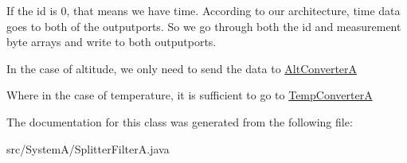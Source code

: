 If the id is 0, that means we have time. According to our architecture, time data goes to both of the outputports. So we go through both the id and measurement byte arrays and write to both outputports.

In the case of altitude, we only need to send the data to \hyperlink{class_system_a_1_1_alt_converter_a}{Alt\+Converter\+A}

Where in the case of temperature, it is sufficient to go to \hyperlink{class_system_a_1_1_temp_converter_a}{Temp\+Converter\+A}

The documentation for this class was generated from the following file\+:\begin{DoxyCompactItemize}
\item 
src/\+System\+A/Splitter\+Filter\+A.\+java\end{DoxyCompactItemize}
